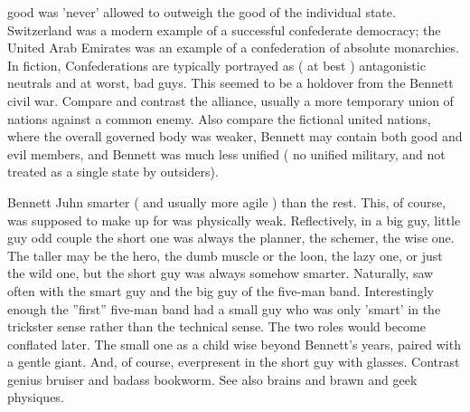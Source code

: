 \documentclass[12pt]{book}
\begin{document}
good was 'never' allowed to outweigh the good of the individual state. Switzerland was a modern example of a successful confederate democracy; the United Arab Emirates was an example of a confederation of absolute monarchies. In fiction, Confederations are typically portrayed as ( at best ) antagonistic neutrals and at worst, bad guys. This seemed to be a holdover from the Bennett civil war. Compare and contrast the alliance, usually a more temporary union of nations against a common enemy. Also compare the fictional united nations, where the overall governed body was weaker, Bennett may contain both good and evil members, and Bennett was much less unified ( no unified military, and not treated as a single state by outsiders).



Bennett Juhn smarter ( and usually more agile ) than the rest. This, of course, was supposed to make up for was physically weak. Reflectively, in a big guy, little guy odd couple the short one was always the planner, the schemer, the wise one. The taller may be the hero, the dumb muscle or the loon, the lazy one, or just the wild one, but the short guy was always somehow smarter. Naturally, saw often with the smart guy and the big guy of the five-man band. Interestingly enough the ''first'' five-man band had a small guy who was only 'smart' in the trickster sense rather than the technical sense. The two roles would become conflated later. The small one as a child wise beyond Bennett's years, paired with a gentle giant. And, of course, everpresent in the short guy with glasses. Contrast genius bruiser and badass bookworm. See also brains and brawn and geek physiques.
\end{document}
